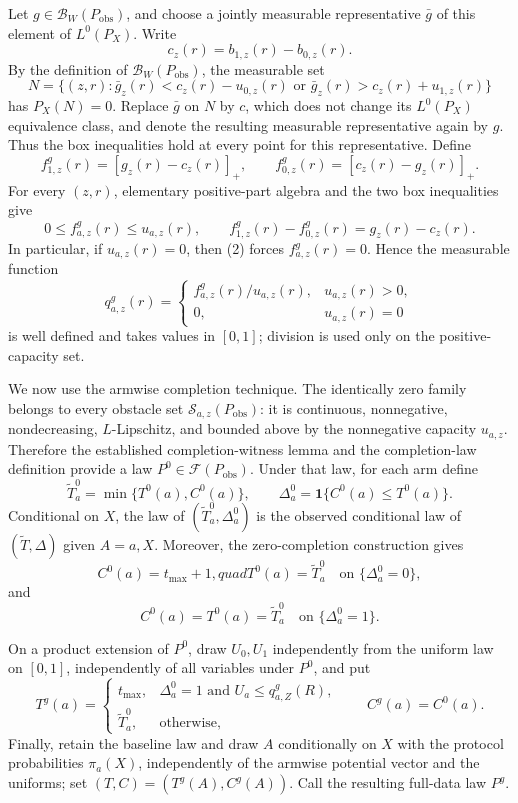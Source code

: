 Let \(g\in\mathcal B_W(P_{\mathrm{obs}})\), and choose a jointly measurable representative \(\bar g\) of this element of \(L^0(P_X)\).  Write
\[
c_z(r)=b_{1,z}(r)-b_{0,z}(r).
\]
By the definition of \(\mathcal B_W(P_{\mathrm{obs}})\), the measurable set
\[
N=\{(z,r):\bar g_z(r)<c_z(r)-u_{0,z}(r)\text{ or }\bar g_z(r)>c_z(r)+u_{1,z}(r)\}
\]
has \(P_X(N)=0\).  Replace \(\bar g\) on \(N\) by \(c\), which does not change its \(L^0(P_X)\) equivalence class, and denote the resulting measurable representative again by \(g\).  Thus the box inequalities hold at every point for this representative.  Define
\[
f^g_{1,z}(r)=[g_z(r)-c_z(r)]_+,
\qquad
f^g_{0,z}(r)=[c_z(r)-g_z(r)]_+.
\tag{1}
\]
For every \((z,r)\), elementary positive-part algebra and the two box inequalities give
\[
0\le f^g_{a,z}(r)\le u_{a,z}(r),
\qquad
f^g_{1,z}(r)-f^g_{0,z}(r)=g_z(r)-c_z(r).
\tag{2}
\]
In particular, if \(u_{a,z}(r)=0\), then (2) forces \(f^g_{a,z}(r)=0\).  Hence the measurable function
\[
q^g_{a,z}(r)=
\begin{cases}
f^g_{a,z}(r)/u_{a,z}(r),&u_{a,z}(r)>0,\\
0,&u_{a,z}(r)=0
\end{cases}
\tag{3}
\]
is well defined and takes values in \([0,1]\); division is used only on the positive-capacity set.

We now use the armwise completion technique.  The identically zero family belongs to every obstacle set \(\mathcal S_{a,z}(P_{\mathrm{obs}})\): it is continuous, nonnegative, nondecreasing, \(L\)-Lipschitz, and bounded above by the nonnegative capacity \(u_{a,z}\).  Therefore the established completion-witness lemma and the completion-law definition provide a law \(P^0\in\mathcal F(P_{\mathrm{obs}})\).  Under that law, for each arm define
\[
\widetilde T_a^0=\min\{T^0(a),C^0(a)\},
\qquad
\Delta_a^0=\mathbf 1\{C^0(a)\le T^0(a)\}.
\tag{4}
\]
Conditional on \(X\), the law of \((\widetilde T_a^0,\Delta_a^0)\) is the observed conditional law of \((\widetilde T,\Delta)\) given \(A=a,X\).  Moreover, the zero-completion construction gives
\[
C^0(a)=t_{\max}+1,quad T^0(a)=\widetilde T_a^0
\quad\text{on }\{\Delta_a^0=0\},
\]
and
\[
C^0(a)=T^0(a)=\widetilde T_a^0
\quad\text{on }\{\Delta_a^0=1\}.
\tag{5}
\]

On a product extension of \(P^0\), draw \(U_0,U_1\) independently from the uniform law on \([0,1]\), independently of all variables under \(P^0\), and put
\[
T^g(a)=
\begin{cases}
t_{\max},&\Delta_a^0=1\text{ and }U_a\le q^g_{a,Z}(R),\\
\widetilde T_a^0,&\text{otherwise},
\end{cases}
\qquad
C^g(a)=C^0(a).
\tag{6}
\]
Finally, retain the baseline law and draw \(A\) conditionally on \(X\) with the protocol probabilities \(\pi_a(X)\), independently of the armwise potential vector and the uniforms; set \((T,C)=(T^g(A),C^g(A))\).  Call the resulting full-data law \(P^g\).

